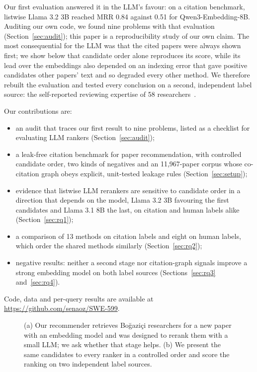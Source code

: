 \documentclass[sigconf,nonacm]{acmart}
\begin{document}
Our first evaluation answered it in the LLM's favour: on a citation benchmark, listwise Llama 3.2 3B reached MRR 0.84 against 0.51 for Qwen3-Embedding-8B.
Auditing our own code, we found nine problems with that evaluation (Section~\ref{sec:audit}); this paper is a reproducibility study of our own claim.
The most consequential for the LLM was that the cited papers were always shown first; we show below that candidate order alone reproduces its score, while its lead over the embeddings also depended on an indexing error that gave positive candidates other papers' text and so degraded every other method.
We therefore rebuilt the evaluation and tested every conclusion on a second, independent label source: the self-reported reviewing expertise of 58 researchers~\citep{stelmakh2025gold}.

Our contributions are:
\begin{itemize}[leftmargin=*]
  \item an audit that traces our first result to nine problems, listed as a checklist for evaluating LLM rankers (Section~\ref{sec:audit});
  \item a leak-free citation benchmark for paper recommendation, with controlled candidate order, two kinds of negatives and an 11,967-paper corpus whose co-citation graph obeys explicit, unit-tested leakage rules (Section~\ref{sec:setup});
  \item evidence that listwise LLM rerankers are sensitive to candidate order in a direction that depends on the model, Llama 3.2 3B favouring the first candidates and Llama 3.1 8B the last, on citation and human labels alike (Section~\ref{sec:rq1});
  \item a comparison of 13 methods on citation labels and eight on human labels, which order the shared methods similarly (Section~\ref{sec:rq2});
  \item negative results: neither a second stage nor citation-graph signals improve a strong embedding model on both label sources (Sections~\ref{sec:rq3} and~\ref{sec:rq4}).
\end{itemize}
Code, data and per-query results are available at \url{https://github.com/senaoz/SWE-599}.

\begin{figure}[t]
  \centering
  
  \caption{(a) Our recommender retrieves Boğaziçi researchers for a new paper with an embedding model and was designed to rerank them with a small LLM; we ask whether that stage helps. (b) We present the same candidates to every ranker in a controlled order and score the ranking on two independent label sources.}
  \label{fig:design}
\end{figure}
\end{document}
